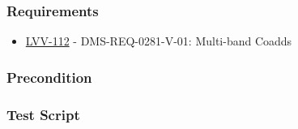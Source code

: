 \hypertarget{requirements-47}{%
\subsubsection{Requirements}\label{requirements-47}}

\begin{itemize}
\tightlist
\item
  \href{https://jira.lsstcorp.org/browse/LVV-112}{LVV-112} -
  DMS-REQ-0281-V-01: Multi-band Coadds
\end{itemize}

\hypertarget{precondition-3}{%
\subsubsection{Precondition}\label{precondition-3}}

\hypertarget{test-script-23}{%
\subsubsection{Test Script}\label{test-script-23}}

